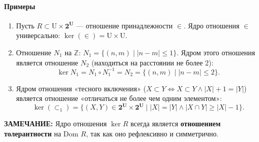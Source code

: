 \paragraph{Примеры}
\begin{enumerate}
    \item Пусть $R \subset \text{U} \times \mathbf{2^{\text{U}}}$ --- отношение принадлежности $\in$. Ядро отношения $\in$ универсально: $\ker (\in) = \text{U} \times \text{U}$.
    \item Отношение $N_1$ на $\mathbb{Z}$: $N_1 = \{(n, m) \mid |n - m| \le 1\}$.
    Ядром этого отношения является отношение $N_2$ (находиться на расстоянии не более 2):
    $$\ker N_1 = N_1 \circ N_1^{-1} = N_2 = \{(n, m) \mid |n - m| \le 2\}.$$
    \item Ядром отношения «тесного включения» ($X \subset Y \iff X \subset Y \land |X|+1=|Y|$) является отношение «отличаться не более чем одним элементом»:
    $$\ker (\subset_1) = \{(X, Y) \in \mathbf{2^{\text{U}}} \times \mathbf{2^{\text{U}}} \mid |X| = |Y| \land |X \cap Y| \ge |X| - 1\}.$$
\end{enumerate}
\textbf{ЗАМЕЧАНИЕ:} Ядро отношения $\ker R$ всегда является \textbf{отношением толерантности} на $\text{Dom } R$, так как оно рефлексивно и симметрично.